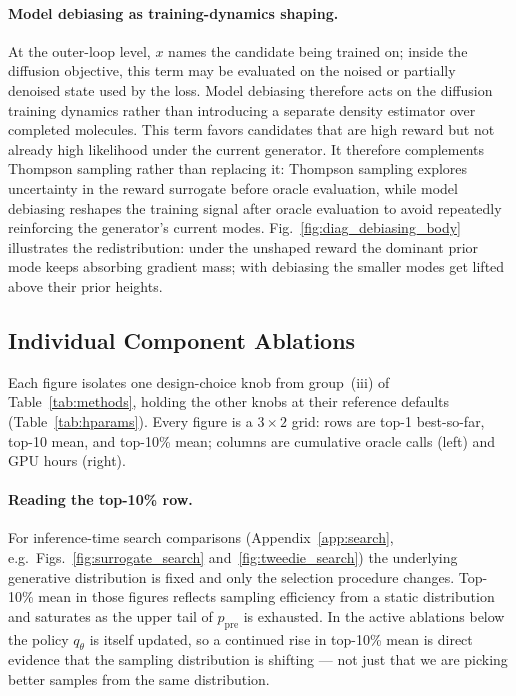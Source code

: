 \documentclass{article}
\begin{document}
\paragraph{Model debiasing as training-dynamics shaping.} At the outer-loop level, $x$ names the candidate being trained on; inside the diffusion objective, this term may be evaluated on the noised or partially denoised state used by the loss. Model debiasing therefore acts on the diffusion training dynamics rather than introducing a separate density estimator over completed molecules. This term favors candidates that are high reward but not already high likelihood under the current generator. It therefore complements Thompson sampling rather than replacing it: Thompson sampling explores uncertainty in the reward surrogate before oracle evaluation, while model debiasing reshapes the training signal after oracle evaluation to avoid repeatedly reinforcing the generator's current modes. Fig.~\ref{fig:diag_debiasing_body} illustrates the redistribution: under the unshaped reward the dominant prior mode keeps absorbing gradient mass; with debiasing the smaller modes get lifted above their prior heights.


\subsection{Individual Component Ablations}\label{app:knobs}

Each figure isolates one design-choice knob from group~(iii) of Table~\ref{tab:methods}, holding the other knobs at their reference defaults (Table~\ref{tab:hparams}). Every figure is a $3 \times 2$ grid: rows are top-1 best-so-far, top-10 mean, and top-10\% mean; columns are cumulative oracle calls (left) and GPU hours (right).

\paragraph{Reading the top-10\% row.} For inference-time search comparisons (Appendix~\ref{app:search}, e.g.\ Figs.~\ref{fig:surrogate_search} and~\ref{fig:tweedie_search}) the underlying generative distribution is fixed and only the selection procedure changes. Top-10\% mean in those figures reflects sampling efficiency from a static distribution and saturates as the upper tail of $p_{\text{pre}}$ is exhausted. In the active ablations below the policy $q_\theta$ is itself updated, so a continued rise in top-10\% mean is direct evidence that the sampling distribution is shifting --- not just that we are picking better samples from the same distribution.
\end{document}
